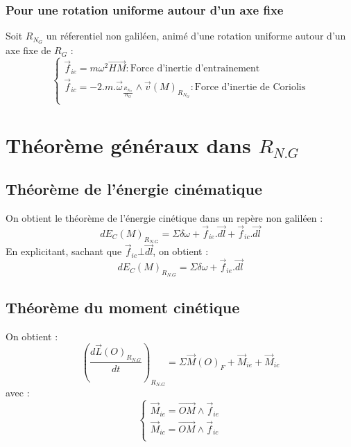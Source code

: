 \subsubsection{Pour une rotation uniforme autour d'un axe fixe}
\begin{de}
Soit $R_{N_G}$ un réferentiel non galiléen, animé d'une rotation uniforme autour d'un axe fixe de $R_G$ : 
$$\left\{\begin{array}{l}
   \overrightarrow{f}_{ie} = m\omega^2\overrightarrow{HM}  : \mbox{Force d'inertie d'entrainement}\\
   \overrightarrow{f}_{ic} = -2.m.\overrightarrow{\omega}_{\frac{R_{N_G}}{R_G}}\wedge\overrightarrow{v}(M)_{R_{N_G}}  : \mbox{Force d'inertie de Coriolis}\\
  \end{array}\right.$$
\end{de}
\section{Théorème généraux dans $R_{N.G}$}
\subsection{Théorème de l'énergie cinématique}
On obtient le théorème de l'énergie cinétique dans un repère non galiléen :
$$dE_C(M)_{R_{N.G}} = \Sigma \delta \omega + \overrightarrow{f}_{ie}.\overrightarrow{dl} + \overrightarrow{f}_{ic}.\overrightarrow{dl}$$
En explicitant, sachant que $\overrightarrow{f}_{ic}\bot\overrightarrow{dl}$, on obtient :
$$dE_C(M)_{R_{N.G}} = \Sigma \delta \omega + \overrightarrow{f}_{ie}.\overrightarrow{dl}$$
\subsection{Théorème du moment cinétique}
On obtient : 
$$\left(\dfrac{d\overrightarrow{L}(O)_{R_{N.G}}}{dt} \right)_{R_{N.G}} = \Sigma \overrightarrow{M}(O)_F + \overrightarrow{M}_{ie} +  \overrightarrow{M}_{ic}$$
avec : 
$$\left\{\begin{array}{l}
   \overrightarrow{M}_{ie} = \overrightarrow{OM}\wedge\overrightarrow{f}_{ie}\\
   \overrightarrow{M}_{ic} = \overrightarrow{OM}\wedge\overrightarrow{f}_{ic}\\

  \end{array}\right.$$
